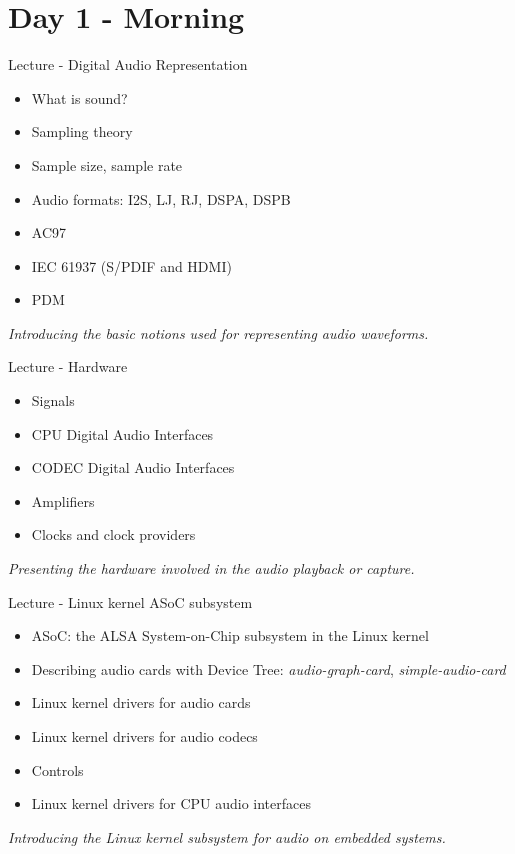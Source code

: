 \documentclass[a4paper,12pt,obeyspaces,spaces,hyphens]{article}
\begin{document}
\feshowtitle

\feshowinfo

\section{Day 1 - Morning}

\feagendatwocolumn
{Lecture - Digital Audio Representation}
{
  \begin{itemize}
  \item What is sound?
  \item Sampling theory
  \item Sample size, sample rate
  \item Audio formats: I2S, LJ, RJ, DSPA, DSPB
  \item AC97
  \item IEC 61937 (S/PDIF and HDMI)
  \item PDM
  \end{itemize}
  \vspace{0.5em}
  {\em Introducing the basic notions used for representing audio waveforms.}
}
{Lecture - Hardware}
{
  \begin{itemize}
  \item Signals
  \item CPU Digital Audio Interfaces
  \item CODEC Digital Audio Interfaces
  \item Amplifiers
  \item Clocks and clock providers
  \end{itemize}
  \vspace{0.5em}
  {\em Presenting the hardware involved in the audio playback or capture.}
}

\feagendaonecolumn
{Lecture - Linux kernel ASoC subsystem}
{
  \begin{itemize}
  \item ASoC: the ALSA System-on-Chip subsystem in the Linux kernel
  \item Describing audio cards with Device Tree: {\em
      audio-graph-card}, {\em simple-audio-card}
  \item Linux kernel drivers for audio cards
  \item Linux kernel drivers for audio codecs
  \item Controls
  \item Linux kernel drivers for CPU audio interfaces
  \end{itemize}
  \vspace{0.5em}
  {\em Introducing the Linux kernel subsystem for audio on embedded systems.}
}
\end{document}
